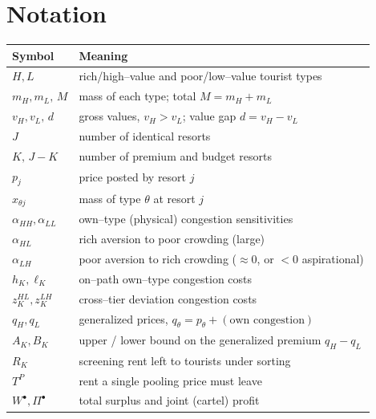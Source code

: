 \documentclass[11pt]{article}
\theoremstyle{plain}
\theoremstyle{definition}
\theoremstyle{remark}
\newcommand{\mH}{m_{H}}
\newcommand{\mL}{m_{L}}
\newcommand{\vH}{v_{H}}
\newcommand{\vL}{v_{L}}
\newcommand{\aHH}{\alpha_{HH}}
\newcommand{\aHL}{\alpha_{HL}}
\newcommand{\aLH}{\alpha_{LH}}
\newcommand{\aLL}{\alpha_{LL}}
\newcommand{\TP}{T^{P}}
\begin{document}
\section{Notation}
\begin{center}
\begin{tabular}{ll}
\toprule
Symbol & Meaning \\
\midrule
$H,L$ & rich/high--value and poor/low--value tourist types \\
$\mH,\mL,\,M$ & mass of each type; total $M=\mH+\mL$ \\
$\vH,\vL,\,d$ & gross values, $\vH>\vL$; value gap $d=\vH-\vL$ \\
$J$ & number of identical resorts \\
$K,\,J-K$ & number of premium and budget resorts \\
$p_j$ & price posted by resort $j$ \\
$x_{\theta j}$ & mass of type $\theta$ at resort $j$ \\
$\aHH,\aLL$ & own--type (physical) congestion sensitivities \\
$\aHL$ & rich aversion to poor crowding (large) \\
$\aLH$ & poor aversion to rich crowding ($\approx0$, or $<0$ aspirational) \\
$h_K,\ell_K$ & on--path own--type congestion costs \\
$z^{HL}_K,z^{LH}_K$ & cross--tier deviation congestion costs \\
$q_H,q_L$ & generalized prices, $q_\theta=p_\theta+(\text{own congestion})$ \\
$A_K,B_K$ & upper / lower bound on the generalized premium $q_H-q_L$ \\
$R_K$ & screening rent left to tourists under sorting \\
$\TP$ & rent a single pooling price must leave \\
$W^{\bullet},\Pi^{\bullet}$ & total surplus and joint (cartel) profit \\
\bottomrule
\end{tabular}
\end{center}
\end{document}
